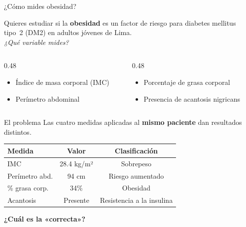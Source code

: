 \documentclass[aspectratio=169, 12pt, xcolor=table]{beamer}
\begin{document}
\begin{frame}{¿Cómo mides obesidad?}
  \begin{caso}
    Quieres estudiar si la \textbf{obesidad} es un factor de riesgo
    para diabetes mellitus tipo~2 (DM2) en adultos jóvenes de Lima.\\[6pt]
    \textit{¿Qué variable mides?}
  \end{caso}

  \vspace{8pt}
  \begin{columns}[T]
    \begin{column}{0.48\textwidth}
      \begin{itemize}
        \item Índice de masa corporal (IMC)
        \item Perímetro abdominal
      \end{itemize}
    \end{column}
    \begin{column}{0.48\textwidth}
      \begin{itemize}
        \item Porcentaje de grasa corporal
        \item Presencia de acantosis nigricans
      \end{itemize}
    \end{column}
  \end{columns}
\end{frame}

\begin{frame}{El problema}
  Las cuatro medidas aplicadas al \textbf{mismo paciente} dan resultados distintos.

  \vspace{10pt}
  \begin{center}
    \begin{tabular}{lcc}
      \toprule
      \textbf{Medida} & \textbf{Valor} & \textbf{Clasificación} \\
      \midrule
      IMC             & 28.4 kg/m²    & Sobrepeso \\
      Perímetro abd.  & 94 cm         & Riesgo aumentado \\
      \% grasa corp.  & 34\%          & Obesidad \\
      Acantosis       & Presente      & Resistencia a la insulina \\
      \bottomrule
    \end{tabular}
  \end{center}

  \vspace{8pt}
  \begin{center}
    \textcolor{accent}{\textbf{¿Cuál es la «correcta»?}}
  \end{center}
\end{frame}
\end{document}
